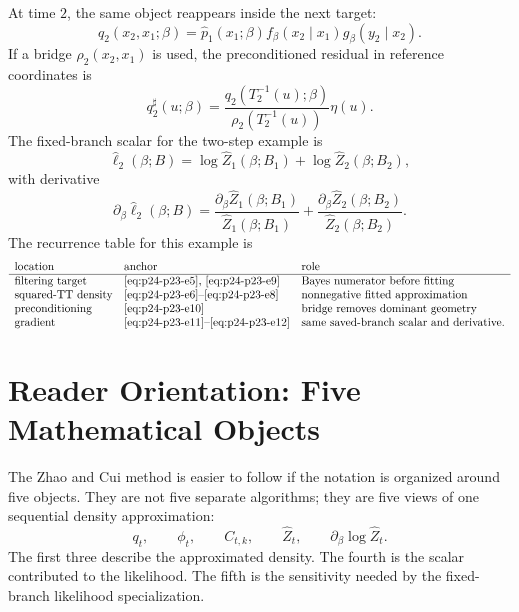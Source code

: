 \documentclass[11pt]{article}
\numberwithin{equation}{section}
\begin{document}
At time \(2\), the same object reappears inside the next target:
\begin{equation}
    q_2(x_2,x_1;\beta)
    =
    \widehat p_1(x_1;\beta)
    f_\beta(x_2\mid x_1)
    g_\beta(y_2\mid x_2).
    \label{eq:p24-p23-e9}
\end{equation}
If a bridge \(\rho_2(x_2,x_1)\) is used, the preconditioned residual in
reference coordinates is
\begin{equation}
    q_2^\sharp(u;\beta)
    =
    \frac{q_2(T_2^{-1}(u);\beta)}
    {\rho_2(T_2^{-1}(u))}
    \eta(u).
    \label{eq:p24-p23-e10}
\end{equation}
The fixed-branch scalar for the two-step example is
\begin{equation}
    \widehat\ell_2(\beta;B)
    =
    \log\widehat Z_1(\beta;B_1)
    +
    \log\widehat Z_2(\beta;B_2),
    \label{eq:p24-p23-e11}
\end{equation}
with derivative
\begin{equation}
    \partial_\beta\widehat\ell_2(\beta;B)
    =
    \frac{\partial_\beta\widehat Z_1(\beta;B_1)}
    {\widehat Z_1(\beta;B_1)}
    +
    \frac{\partial_\beta\widehat Z_2(\beta;B_2)}
    {\widehat Z_2(\beta;B_2)}.
    \label{eq:p24-p23-e12}
\end{equation}
The recurrence table for this example is
\begin{equation}
\begin{array}{lll}
\text{location} & \text{anchor} & \text{role}\\
\hline
\text{filtering target} & \text{\eqref{eq:p24-p23-e5}, \eqref{eq:p24-p23-e9}} &
    \text{Bayes numerator before fitting}\\
\text{squared-TT density} & \text{\eqref{eq:p24-p23-e6}--\eqref{eq:p24-p23-e8}} &
    \text{nonnegative fitted approximation}\\
\text{preconditioning} & \text{\eqref{eq:p24-p23-e10}} &
    \text{bridge removes dominant geometry}\\
\text{gradient} & \text{\eqref{eq:p24-p23-e11}--\eqref{eq:p24-p23-e12}} &
    \text{same saved-branch scalar and derivative.}
\end{array}
\label{eq:p24-p23-e13}
\end{equation}

\section{Reader Orientation: Five Mathematical Objects}

The Zhao and Cui \cite{zhao2024ttsequential} method is easier to follow if the notation is organized around
five objects.  They are not five separate algorithms; they are five views of
one sequential density approximation:
\begin{equation}
    q_t,\qquad \phi_t,\qquad C_{t,k},\qquad \widehat Z_t,
    \qquad \partial_\beta\log\widehat Z_t .
    \label{eq:p24-p22-o1}
\end{equation}
The first three describe the approximated density.  The fourth is the scalar
contributed to the likelihood.  The fifth is the sensitivity needed by the
fixed-branch likelihood specialization.
\end{document}
